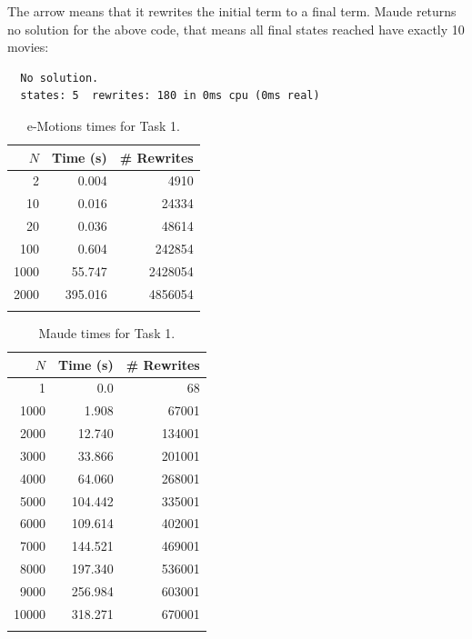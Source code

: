 The arrow \code{=>!} means that it rewrites the initial term to a final term. Maude returns no solution for the above code, that means all final states reached have exactly 10 movies:
\begin{verbatim}
  No solution.
  states: 5  rewrites: 180 in 0ms cpu (0ms real)
\end{verbatim}

\begin{table}
  \begin{center}
	\begin{tabular}{r r r}
	$N$ & Time (s) & \# Rewrites \\
	\hline
	2 & 0.004 & 4910 \\
	10 & 0.016 & 24334 \\
	20 & 0.036 & 48614 \\
	100 & 0.604 & 242854 \\
	1000 & 55.747 & 2428054 \\
	2000 & 395.016 & 4856054 \\
	\hline \\
	\end{tabular}
	\caption{e-Motions times for Task 1.}\label{table:emotionstask1}
	\end{center}
\end{table}

\begin{table}
  \begin{center}
	\begin{tabular}{r r r}
	$N$ & Time (s) & \# Rewrites \\
	\hline
	1 & 0.0 & 68 \\
	1000 & 1.908 & 67001 \\
	2000 & 12.740 & 134001 \\
	3000 & 33.866 & 201001 \\
	4000 & 64.060 & 268001 \\
	5000 & 104.442 & 335001 \\
	6000 & 109.614 & 402001 \\
	7000 & 144.521 & 469001 \\
	8000 & 197.340 & 536001 \\
	9000 & 256.984 & 603001 \\
	10000 & 318.271 & 670001 \\
	\hline \\
	\end{tabular}
	\caption{Maude times for Task 1.}\label{table:maudetask1}
	\end{center}
\end{table}

